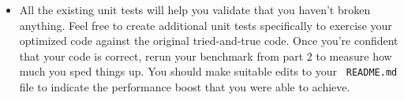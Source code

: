 \begin{itemize}
\item All the existing unit tests will help you validate that you
  haven't broken anything. Feel free to create additional unit tests
  specifically to exercise your optimized code against the original
  tried-and-true code. Once you're confident that your code is
  correct, rerun your benchmark from part 2 to measure how much you
  sped things up. You should make suitable edits to your {\tt
    README.md} file to indicate the performance boost that you were
  able to achieve.
\end{itemize}

\noindent





